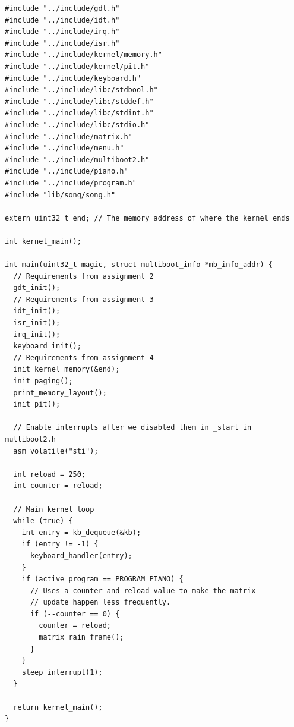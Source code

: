 \documentclass[../main.tex]{subfiles}
\begin{document}
\begin{listing}[H]
    \begin{verbatim}
#include "../include/gdt.h"
#include "../include/idt.h"
#include "../include/irq.h"
#include "../include/isr.h"
#include "../include/kernel/memory.h"
#include "../include/kernel/pit.h"
#include "../include/keyboard.h"
#include "../include/libc/stdbool.h"
#include "../include/libc/stddef.h"
#include "../include/libc/stdint.h"
#include "../include/libc/stdio.h"
#include "../include/matrix.h"
#include "../include/menu.h"
#include "../include/multiboot2.h"
#include "../include/piano.h"
#include "../include/program.h"
#include "lib/song/song.h"

extern uint32_t end; // The memory address of where the kernel ends

int kernel_main();

int main(uint32_t magic, struct multiboot_info *mb_info_addr) {
  // Requirements from assignment 2
  gdt_init();
  // Requirements from assignment 3
  idt_init();
  isr_init();
  irq_init();
  keyboard_init();
  // Requirements from assignment 4
  init_kernel_memory(&end);
  init_paging();
  print_memory_layout();
  init_pit();

  // Enable interrupts after we disabled them in _start in multiboot2.h
  asm volatile("sti");

  int reload = 250;
  int counter = reload;

  // Main kernel loop
  while (true) {
    int entry = kb_dequeue(&kb);
    if (entry != -1) {
      keyboard_handler(entry);
    }
    if (active_program == PROGRAM_PIANO) {
      // Uses a counter and reload value to make the matrix
      // update happen less frequently.
      if (--counter == 0) {
        counter = reload;
        matrix_rain_frame();
      }
    }
    sleep_interrupt(1);
  }

  return kernel_main();
}
    \end{verbatim}
    \caption{Implementation of \texttt{kernel.c}}
    \label{lst:kernel_c}
\end{listing}
\end{document}
